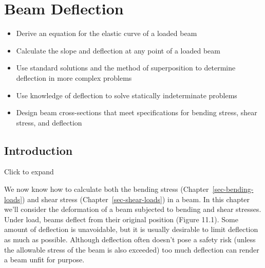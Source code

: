 \documentclass[
  letterpaper,
  DIV=11,
  numbers=noendperiod]{scrreprt}
\providecommand{\tightlist}{%
  \setlength{\itemsep}{0pt}\setlength{\parskip}{0pt}}\usepackage{longtable,booktabs,array}
\theoremstyle{definition}
\theoremstyle{remark}
\begin{document}

\chapter{Beam Deflection}\label{sec-beam-deflection}

\begin{tcolorbox}[enhanced jigsaw, leftrule=.75mm, colbacktitle=quarto-callout-note-color!10!white, breakable, opacityback=0, colback=white, titlerule=0mm, toprule=.15mm, colframe=quarto-callout-note-color-frame, coltitle=black, title={Learning Objectives}, toptitle=1mm, bottomrule=.15mm, rightrule=.15mm, left=2mm, arc=.35mm, opacitybacktitle=0.6, bottomtitle=1mm]

\begin{itemize}
\tightlist
\item
  Derive an equation for the elastic curve of a loaded beam
\item
  Calculate the slope and deflection at any point of a loaded beam
\item
  Use standard solutions and the method of superposition to determine
  deflection in more complex problems
\item
  Use knowledge of deflection to solve statically indeterminate problems
\item
  Design beam cross-sections that meet specifications for bending
  stress, shear stress, and deflection
\end{itemize}

\end{tcolorbox}

\section*{Introduction}\label{introduction-10}


Click to expand

We now know how to calculate both the bending stress
(Chapter~\ref{sec-bending-loads}) and shear stress
(Chapter~\ref{sec-shear-loads}) in a beam. In this chapter we'll
consider the deformation of a beam subjected to bending and shear
stresses. Under load, beams deflect from their original position (Figure
11.1). Some amount of deflection is unavoidable, but it is usually
desirable to limit deflection as much as possible. Although deflection
often doesn't pose a safety risk (unless the allowable stress of the
beam is also exceeded) too much deflection can render a beam unfit for
purpose.
\end{document}
